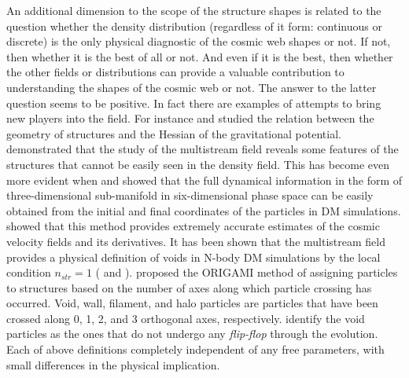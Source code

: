 An additional dimension to the scope of the structure shapes is related to the question whether the density distribution (regardless of it form: continuous or discrete) is the only physical diagnostic of the cosmic web shapes or not. If not, then whether it is the best of all or not. And even if it is the best, then whether the other fields or distributions can provide a valuable contribution to understanding the shapes of the cosmic web or not. The answer to the latter question seems to be positive. In fact there are examples of attempts to bring new players into the field. For instance \cite{Hahn2007} and \cite{Forero-Romero2009a} studied the relation between the geometry of structures and the Hessian of the gravitational potential. \cite{Shandarin2011} demonstrated that the study of the multistream field reveals some features of the structures that cannot be easily seen in the density field. This has become even more evident when \cite{Shandarin2012} and \cite{Abel2012} showed that the full dynamical information in the form of three-dimensional  sub-manifold in six-dimensional phase space can be easily obtained from the  initial and final coordinates of the particles in DM simulations. \cite{Hahn2015a} showed that this method provides extremely accurate estimates of the cosmic velocity fields and its derivatives. It has been shown that the multistream field provides a physical definition of voids in N-body DM simulations by the local condition $n_{str} = 1$ (\citealt{Shandarin2012} and \citealt{Ramachandra2015}). \cite{Falck2012} proposed the {ORIGAMI} method of assigning particles to  structures based on the number of axes along which particle crossing has occurred. Void, wall, filament, and halo particles are particles that have been crossed along 0, 1, 2, and 3 orthogonal axes, respectively. \cite{Shandarin2016} identify the void particles as the ones that do not undergo any {\it flip-flop} through the evolution. Each of above definitions completely independent of any free parameters, with small differences in the physical implication.




